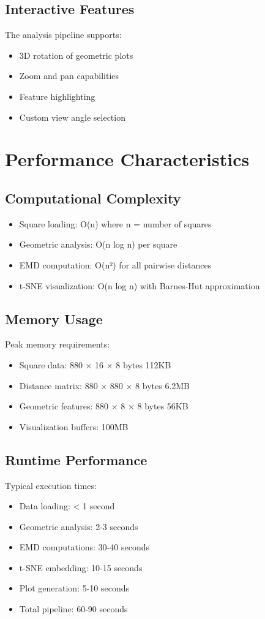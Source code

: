 \documentclass[11pt]{article}
\begin{document}
\subsection{Interactive Features}
The analysis pipeline supports:
\begin{itemize}
    \item 3D rotation of geometric plots
    \item Zoom and pan capabilities
    \item Feature highlighting
    \item Custom view angle selection
\end{itemize}

\section{Performance Characteristics}
\label{sec:performance}

\subsection{Computational Complexity}
\begin{itemize}
    \item Square loading: O(n) where n = number of squares
    \item Geometric analysis: O(n log n) per square
    \item EMD computation: O(n²) for all pairwise distances
    \item t-SNE visualization: O(n log n) with Barnes-Hut approximation
\end{itemize}

\subsection{Memory Usage}
Peak memory requirements:
\begin{itemize}
    \item Square data: 880 × 16 × 8 bytes \approx 112KB
    \item Distance matrix: 880 × 880 × 8 bytes \approx 6.2MB
    \item Geometric features: 880 × 8 × 8 bytes \approx 56KB
    \item Visualization buffers: \approx 100MB
\end{itemize}

\subsection{Runtime Performance}
Typical execution times:
\begin{itemize}
    \item Data loading: < 1 second
    \item Geometric analysis: 2-3 seconds
    \item EMD computations: 30-40 seconds
    \item t-SNE embedding: 10-15 seconds
    \item Plot generation: 5-10 seconds
    \item Total pipeline: 60-90 seconds
\end{itemize}
\end{document}
